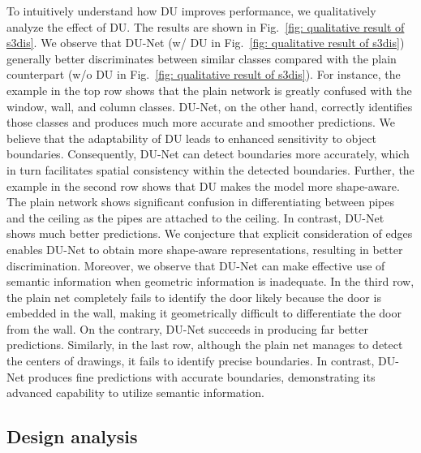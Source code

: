 \documentclass[a4paper,fleqn]{cas-dc}
\begin{document}
To intuitively understand how DU improves performance, we qualitatively analyze the effect of DU. The results are shown in Fig.~\ref{fig: qualitative result of s3dis}. We observe that DU-Net (w/ DU in Fig.~\ref{fig: qualitative result of s3dis}) generally better discriminates between similar classes compared with the plain counterpart (w/o DU in Fig.~\ref{fig: qualitative result of s3dis}). For instance, the example in the top row shows that the plain network is greatly confused with the window, wall, and column classes. DU-Net, on the other hand, correctly identifies those classes and produces much more accurate and smoother predictions. We believe that the adaptability of DU leads to enhanced sensitivity to object boundaries. Consequently, DU-Net can detect boundaries more accurately, which in turn facilitates spatial consistency within the detected boundaries.
Further, the example in the second row shows that DU makes the model more shape-aware. The plain network shows significant confusion in differentiating between pipes and the ceiling as the pipes are attached to the ceiling. In contrast, DU-Net shows much better predictions. We conjecture that explicit consideration of edges enables DU-Net to obtain more shape-aware representations, resulting in better discrimination.   
Moreover, we observe that DU-Net can make effective use of semantic information when geometric information is inadequate. In the third row, the plain net completely fails to identify the door likely because the door is embedded in the wall, making it geometrically difficult to differentiate the door from the wall. On the contrary, DU-Net succeeds in producing far better predictions. Similarly, in the last row, although the plain net manages to detect the centers of drawings, it fails to identify precise boundaries. In contrast, DU-Net produces fine predictions with accurate boundaries, demonstrating its advanced capability to utilize semantic information.    











\subsection{Design analysis}
\label{sec: design}
\end{document}
